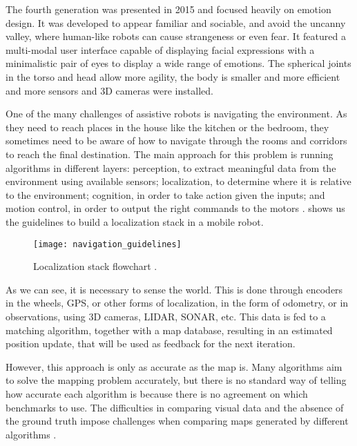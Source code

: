 The fourth generation was presented in 2015 and focused heavily on emotion design. It was developed to appear familiar and sociable, and avoid the uncanny valley, where human-like robots can cause strangeness or even fear. It featured a multi-modal user interface capable of displaying facial expressions with a minimalistic pair of eyes to display a wide range of emotions. The spherical joints in the torso and head allow more agility, the body is smaller and more efficient and more sensors and 3D cameras were installed.

One of the many challenges of assistive robots is navigating the environment. As they need to reach places in the house like the kitchen or the bedroom, they sometimes need to be aware of how to navigate through the rooms and corridors to reach the final destination. The main approach for this problem is running algorithms in different layers: perception, to extract meaningful data from the environment using available sensors; localization, to determine where it is relative to the environment; cognition, in order to take action given the inputs; and motion control, in order to output the right commands to the motors \cite{siegwart2011introduction}.  shows us the guidelines to build a localization stack in a mobile robot.

\begin{figure}[!ht]
    \centering
    \texttt{[image: navigation\_guidelines]}
    \caption{Localization stack flowchart \cite{siegwart2011introduction}.}
    \label{fig:navigation_guidelines}
\end{figure}

As we can see, it is necessary to sense the world. This is done through encoders in the wheels, GPS, or other forms of localization, in the form of odometry, or in observations, using 3D cameras, LIDAR, SONAR, etc. This data is fed to a matching algorithm, together with a map database, resulting in an estimated position update, that will be used as feedback for the next iteration.

However, this approach is only as accurate as the map is. Many algorithms aim to solve the mapping problem accurately, but there is no standard way of telling how accurate each algorithm is because there is no agreement on which benchmarks to use. The difficulties in comparing visual data and the absence of the ground truth impose challenges when comparing maps generated by different algorithms \cite{amigoni2007good}.

